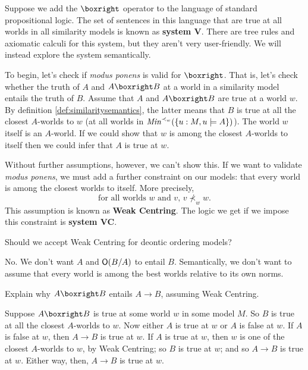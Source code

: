 Suppose we add the $\boxright$ operator to the language of standard
propositional logic. The set of sentences in this language that are true at all
worlds in all similarity models is known as \textbf{system V}. There are tree
rules and axiomatic calculi for this system, but they aren't very user-friendly.
We will instead explore the system semantically.

To begin, let's check if \emph{modus ponens} is valid for $\boxright$. That is,
let's check whether the truth of $A$ and $A \boxright B$ at a world in a
similarity model entails the truth of $B$. Assume that $A$ and $A \boxright B$
are true at a world $w$. By definition \ref{def:similaritysemantics}, the latter
means that $B$ is true at all the closest $A$-worlds to $w$ (at all worlds in
$\emph{Min}^{\prec_w}(\{u: M,u\models A\})$). The world $w$ itself is an
$A$-world. If we could show that $w$ is among the closest $A$-worlds to itself
then we could infer that $A$ is true at $w$.

Without further assumptions, however, we can't show this. If we want to validate
\emph{modus ponens}, we must add a further constraint on our models: that every
world is among the closest worlds to itself. More precisely,
\[
  \text{for all worlds $w$ and $v$, $v \nprec_{w} w$.}
\]
This assumption is known as \textbf{Weak Centring}.
The logic we get if we impose this constraint is \textbf{system VC}.

\begin{exercise}
  Should we accept Weak Centring for deontic ordering models?
\end{exercise}
\begin{solution}
  No. We don't want $A$ and $\operatorname{\mathsf{O}}(B/A)$ to entail $B$. Semantically, we don't
  want to assume that every world is among the best worlds relative to its own
  norms.
\end{solution}

\begin{exercise}
  Explain why $A \boxright B$ entails $A \to B$, assuming Weak Centring.
\end{exercise}
\begin{solution}
  Suppose $A \boxright B$ is true at some world $w$ in some model $M$. So $B$ is
  true at all the closest $A$-worlds to $w$. Now either $A$ is true at $w$ or
  $A$ is false at $w$. If $A$ is false at $w$, then $A\to B$ is true at $w$. If
  $A$ is true at $w$, then $w$ is one of the closest $A$-worlds to $w$, by Weak
  Centring; so $B$ is true at $w$; and so $A\to B$ is true at $w$. Either way,
  then, $A\to B$ is true at $w$.
 \end{solution}

